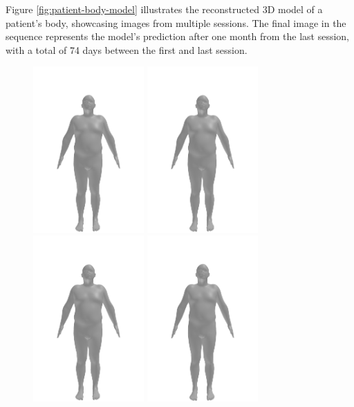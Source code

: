 Figure \ref{fig:patient-body-model} illustrates the reconstructed 3D model of a
patient's body, showcasing images from multiple sessions. The final image in
the sequence represents the model's prediction after one month from the last
session, with a total of 74 days between the first and last session.

\begin{figure}[h]
    \centering
    \includegraphics[width=120pt]{files/patient_2/2_6}
    \includegraphics[width=120pt]{files/patient_2/2_7}
    \includegraphics[width=120pt]{files/patient_2/2_8}
    \includegraphics[width=120pt]{files/patient_2/2_9}

\end{figure}
